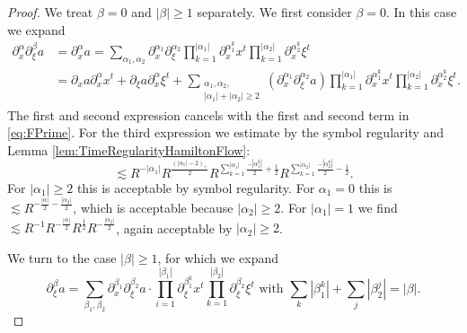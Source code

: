 \documentclass[10pt,a4paper]{amsart}
\begin{document}
\begin{proof}
We treat $\beta = 0$ and $|\beta| \geq 1$ separately. We first consider $\beta = 0$. In this case we expand
\begin{equation*}
\begin{split}
    \partial_x^{\alpha} \partial_{\xi}^{\beta} a &= \partial_x^{\alpha} a = \sum_{\alpha_1,\alpha_2} \partial_x^{\alpha_1} \partial_{\xi}^{\alpha_2} \prod_{k=1}^{|\alpha_1|} \partial_x^{\alpha_1^k} x^t \prod_{k=1}^{|\alpha_2|} \partial_x^{\alpha_2^k} \xi^t \\
    &= \partial_x a \partial_x^{\alpha} x^t + \partial_{\xi} a \partial_x^{\alpha} \xi^t + \sum_{\substack{\alpha_1,\alpha_2,\\|\alpha_1|+|\alpha_2| \geq 2}} (\partial_x^{\alpha_1} \partial_{\xi}^{\alpha_2} a) \prod_{k=1}^{|\alpha_1|} \partial_x^{\alpha_1^k } x^t  \prod_{k=1}^{|\alpha_2|} \partial_x^{\alpha_2^k} \xi^t.
\end{split}    
\end{equation*}
The first and second expression cancels with the first and second term in \eqref{eq:FPrime}. For the third expression we estimate by the symbol regularity and Lemma \ref{lem:TimeRegularityHamiltonFlow}:
\begin{equation*}
        \lesssim R^{-|\alpha_1|} R^{\frac{(|\alpha_1|-2)_+}{2}} R^{\sum_{k=1}^{|\alpha_1|} \frac{-|\alpha_1^k|}{2}+\frac{1}{2}} R^{\sum_{k=1}^{|\alpha_2|} \frac{-|\alpha_2^k|}{2} - \frac{1}{2}}.
\end{equation*}
For $|\alpha_1| \geq 2$ this is acceptable by symbol regularity. For $\alpha_1 = 0$ this is $\lesssim R^{-\frac{|\alpha|}{2}-\frac{|\alpha_2|}{2}}$, which is acceptable because $|\alpha_2| \geq 2$. For $|\alpha_1| = 1$ we find $\lesssim R^{-1} R^{-\frac{|\alpha|}{2}} R^{\frac{1}{2}} R^{-\frac{|\alpha_2|}{2}}$, again acceptable by $|\alpha_2| \geq 2$. 

\smallskip

We turn to the case $|\beta| \geq 1$, for which we expand 
\begin{equation*}
\partial_{\xi}^{\beta} a = \sum_{\beta_1,\beta_2} \partial_x^{\beta_1} \partial_{\xi}^{\beta_2} a \cdot \prod_{i=1}^{|\beta_1|} \partial_{\xi}^{\beta_1^k} x^t \prod_{k=1}^{|\beta_2|} \partial_{\xi}^{\beta_2} \xi^t \text{ with } \sum_k|\beta_1^k| + \sum_j |\beta_2^j| = |\beta|.
\end{equation*}


\end{proof}
\end{document}
